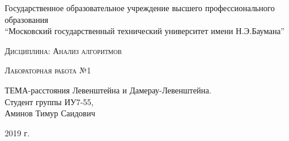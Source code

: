 \documentclass[a4paper, 14pt]{article}
\begin{document}
    \begin{titlepage}

        \begin{center}
            \large
            Государственное образовательное учреждение высшего профессионального образования\\
            “Московский государственный технический университет имени Н.Э.Баумана”
            \vspace{3cm}
            
            \textsc{Дисциплина: Анализ алгоритмов}
            \vspace{0.5cm}
                
            \textsc{Лабораторная работа №1}
            \vspace{1.5cm}
            
            {\LARGE ТЕМА-расстояния Левенштейна и Дамерау-Левенштейна.\\}
            \vspace{1.5cm}
            Студент группы ИУ7-55,\\   
            Аминов Тимур Саидович
            \vfill
            
            2019 г.
            
            \end{center}

    \end{titlepage}
\tableofcontents
	
	\newpage
	
\end{document}
